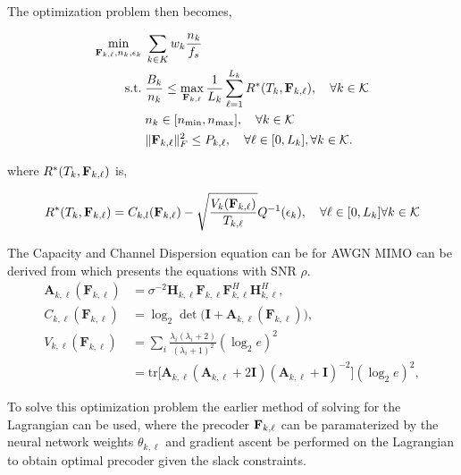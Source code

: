 \documentclass[a4paper, 12pt, onecolumn, journal, twoside, draftclsnofoot]{IEEEtran}
\begin{document}
The optimization problem then becomes, 

\begin{equation*}
	\begin{split}
		\min_{{\bf F}_{k,\ell}, n_k, \epsilon_k} \;& \sum_{k \in K} w_k \frac{n_k}{f_s} \\
		\text{s.t.}\;& \frac{B_k}{n_k} \leq \max_{{\bf F}_{k, \ell}} \frac{1}{L_k} \sum_{\ell=1}^{L_k} 		R^*(T_{k}, {\bf F}_{k, \ell}), \quad \forall k \in { \mathcal{K} } \\ 
		& n_k \in [n_{\text{min}}, n_{\text{max}}], \quad \forall k \in { \mathcal{K} } \\
		& \|{\bf F}_{k,\ell}\|_F^2 \leq P_{k,\ell}, \quad \forall \ell \in [0, L_k],  \forall k \in { \mathcal{K} }.
	\end{split}
\end{equation*}

where $R^*(T_k, {\bf F}_{k,\ell})$ is,

\begin{equation*}
	R^*(T_{k} , {\bf F}_{k,\ell}) =  C_{k,l}({\bf F}_{k,\ell}) - \sqrt{ \frac{V_k({\bf F}_{k,\ell})}{ T_{k, \ell} } } Q^{-1}  (\epsilon_k), \quad \forall \ell \in [0,L_k] \forall k \in { \mathcal{K} }\\
\end{equation*}

The Capacity and Channel Dispersion equation can be for AWGN MIMO can be derived from \cite{yuri2010} which presents the equations with SNR $\rho$.
\begin{equation*}
	\begin{aligned}
		\mathbf{A}_{k,\ell}(\mathbf{F}_{k,\ell}) &= \sigma^{-2} \mathbf{H}_{k,\ell} \mathbf{F}_{k,\ell} \mathbf{F}_{k,\ell}^H \mathbf{H}_{k,\ell}^H, \\[2mm]
		C_{k,\ell}(\mathbf{F}_{k,\ell}) &= \log_2 \det \Big( \mathbf{I} + \mathbf{A}_{k,\ell}(\mathbf{F}_{k,\ell}) \Big), \\[1mm]
		V_{k,\ell}(\mathbf{F}_{k,\ell}) &= \sum_i \frac{\lambda_i \left(\lambda_i + 2 \right)}{\left(\lambda_i + 1 \right)^2} (\log_2 e)^2 \\[1mm]
		&= \text{tr} \Big[ \mathbf{A}_{k,\ell} (\mathbf{A}_{k,\ell}+2 \mathbf{I}) (\mathbf{A}_{k,\ell} + \mathbf{I})^{-2} \Big] (\log_2 e)^2,
	\end{aligned}
\end{equation*}


To solve this optimization problem the earlier method of solving for the Lagrangian can be used, where the precoder ${\bf F}_{k,\ell}$ can be paramaterized by the neural network weights $\theta_{k,\ell}$ and gradient ascent be performed on the Lagrangian to obtain optimal precoder given the slack constraints.
\end{document}
